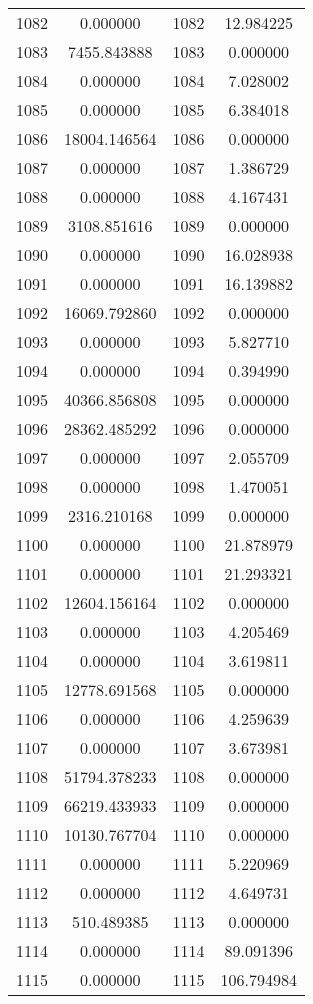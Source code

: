 \documentclass[12pt]{article}
\begin{document}
\begin{longtable}{@{}cccc@{}}
1082 & 0.000000 & 1082 & 12.984225 \\
1083 & 7455.843888 & 1083 & 0.000000 \\
1084 & 0.000000 & 1084 & 7.028002 \\
1085 & 0.000000 & 1085 & 6.384018 \\
1086 & 18004.146564 & 1086 & 0.000000 \\
1087 & 0.000000 & 1087 & 1.386729 \\
1088 & 0.000000 & 1088 & 4.167431 \\
1089 & 3108.851616 & 1089 & 0.000000 \\
1090 & 0.000000 & 1090 & 16.028938 \\
1091 & 0.000000 & 1091 & 16.139882 \\
1092 & 16069.792860 & 1092 & 0.000000 \\
1093 & 0.000000 & 1093 & 5.827710 \\
1094 & 0.000000 & 1094 & 0.394990 \\
1095 & 40366.856808 & 1095 & 0.000000 \\
1096 & 28362.485292 & 1096 & 0.000000 \\
1097 & 0.000000 & 1097 & 2.055709 \\
1098 & 0.000000 & 1098 & 1.470051 \\
1099 & 2316.210168 & 1099 & 0.000000 \\
1100 & 0.000000 & 1100 & 21.878979 \\
1101 & 0.000000 & 1101 & 21.293321 \\
1102 & 12604.156164 & 1102 & 0.000000 \\
1103 & 0.000000 & 1103 & 4.205469 \\
1104 & 0.000000 & 1104 & 3.619811 \\
1105 & 12778.691568 & 1105 & 0.000000 \\
1106 & 0.000000 & 1106 & 4.259639 \\
1107 & 0.000000 & 1107 & 3.673981 \\
1108 & 51794.378233 & 1108 & 0.000000 \\
1109 & 66219.433933 & 1109 & 0.000000 \\
1110 & 10130.767704 & 1110 & 0.000000 \\
1111 & 0.000000 & 1111 & 5.220969 \\
1112 & 0.000000 & 1112 & 4.649731 \\
1113 & 510.489385 & 1113 & 0.000000 \\
1114 & 0.000000 & 1114 & 89.091396 \\
1115 & 0.000000 & 1115 & 106.794984 \\

\end{longtable}
\end{document}
